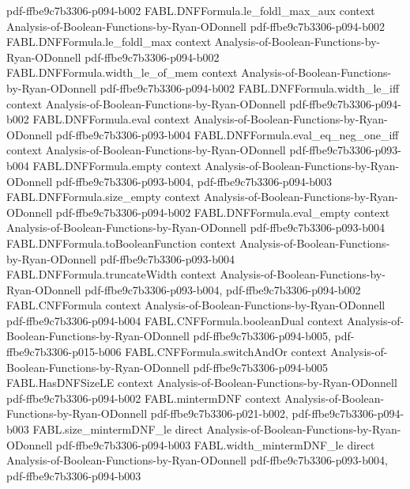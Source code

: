 \begin{theorem}
  {pdf-ffbe9c7b3306-p094-b002}
\proofstep
  {FABL.DNFFormula.le_foldl_max_aux}
  {context}
  {Analysis-of-Boolean-Functions-by-Ryan-ODonnell}
  {pdf-ffbe9c7b3306-p094-b002}
\proofstep
  {FABL.DNFFormula.le_foldl_max}
  {context}
  {Analysis-of-Boolean-Functions-by-Ryan-ODonnell}
  {pdf-ffbe9c7b3306-p094-b002}
\proofstep
  {FABL.DNFFormula.width_le_of_mem}
  {context}
  {Analysis-of-Boolean-Functions-by-Ryan-ODonnell}
  {pdf-ffbe9c7b3306-p094-b002}
\proofstep
  {FABL.DNFFormula.width_le_iff}
  {context}
  {Analysis-of-Boolean-Functions-by-Ryan-ODonnell}
  {pdf-ffbe9c7b3306-p094-b002}
\proofstep
  {FABL.DNFFormula.eval}
  {context}
  {Analysis-of-Boolean-Functions-by-Ryan-ODonnell}
  {pdf-ffbe9c7b3306-p093-b004}
\proofstep
  {FABL.DNFFormula.eval_eq_neg_one_iff}
  {context}
  {Analysis-of-Boolean-Functions-by-Ryan-ODonnell}
  {pdf-ffbe9c7b3306-p093-b004}
\proofstep
  {FABL.DNFFormula.empty}
  {context}
  {Analysis-of-Boolean-Functions-by-Ryan-ODonnell}
  {pdf-ffbe9c7b3306-p093-b004,
    pdf-ffbe9c7b3306-p094-b003}
\proofstep
  {FABL.DNFFormula.size_empty}
  {context}
  {Analysis-of-Boolean-Functions-by-Ryan-ODonnell}
  {pdf-ffbe9c7b3306-p094-b002}
\proofstep
  {FABL.DNFFormula.eval_empty}
  {context}
  {Analysis-of-Boolean-Functions-by-Ryan-ODonnell}
  {pdf-ffbe9c7b3306-p093-b004}
\proofstep
  {FABL.DNFFormula.toBooleanFunction}
  {context}
  {Analysis-of-Boolean-Functions-by-Ryan-ODonnell}
  {pdf-ffbe9c7b3306-p093-b004}
\proofstep
  {FABL.DNFFormula.truncateWidth}
  {context}
  {Analysis-of-Boolean-Functions-by-Ryan-ODonnell}
  {pdf-ffbe9c7b3306-p093-b004,
    pdf-ffbe9c7b3306-p094-b002}
\proofstep
  {FABL.CNFFormula}
  {context}
  {Analysis-of-Boolean-Functions-by-Ryan-ODonnell}
  {pdf-ffbe9c7b3306-p094-b004}
\proofstep
  {FABL.CNFFormula.booleanDual}
  {context}
  {Analysis-of-Boolean-Functions-by-Ryan-ODonnell}
  {pdf-ffbe9c7b3306-p094-b005,
    pdf-ffbe9c7b3306-p015-b006}
\proofstep
  {FABL.CNFFormula.switchAndOr}
  {context}
  {Analysis-of-Boolean-Functions-by-Ryan-ODonnell}
  {pdf-ffbe9c7b3306-p094-b005}
\proofstep
  {FABL.HasDNFSizeLE}
  {context}
  {Analysis-of-Boolean-Functions-by-Ryan-ODonnell}
  {pdf-ffbe9c7b3306-p094-b002}
\proofstep
  {FABL.mintermDNF}
  {context}
  {Analysis-of-Boolean-Functions-by-Ryan-ODonnell}
  {pdf-ffbe9c7b3306-p021-b002,
    pdf-ffbe9c7b3306-p094-b003}
\proofstep
  {FABL.size_mintermDNF_le}
  {direct}
  {Analysis-of-Boolean-Functions-by-Ryan-ODonnell}
  {pdf-ffbe9c7b3306-p094-b003}
\proofstep
  {FABL.width_mintermDNF_le}
  {direct}
  {Analysis-of-Boolean-Functions-by-Ryan-ODonnell}
  {pdf-ffbe9c7b3306-p093-b004,
    pdf-ffbe9c7b3306-p094-b003}

\end{theorem}
